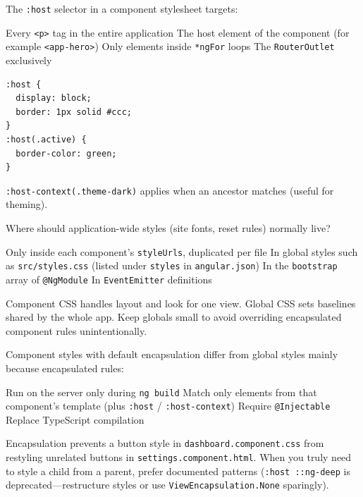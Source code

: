 \question[4]
The \lstinline[style=htmlinline]|:host| selector in a component stylesheet targets:
\begin{choices}
  \choice Every \texttt{<p>} tag in the entire application
  \CorrectChoice The host element of the component (for example \lstinline[style=htmlinline]|<app-hero>|)
  \choice Only elements inside \lstinline[style=htmlinline]|*ngFor| loops
  \choice The \texttt{RouterOutlet} exclusively
\end{choices}
\begin{solution}
\begin{lstlisting}[style=htmlinline]
:host {
  display: block;
  border: 1px solid #ccc;
}
:host(.active) {
  border-color: green;
}
\end{lstlisting}
  \lstinline[style=htmlinline]|:host-context(.theme-dark)| applies when an ancestor matches (useful for theming).
\end{solution}

\question[4]
Where should application-wide styles (site fonts, reset rules) normally live?
\begin{choices}
  \choice Only inside each component's \texttt{styleUrls}, duplicated per file
  \CorrectChoice In global styles such as \texttt{src/styles.css} (listed under \texttt{styles} in \texttt{angular.json})
  \choice In the \texttt{bootstrap} array of \texttt{@NgModule}
  \choice In \lstinline[style=tsinline]|EventEmitter| definitions
\end{choices}
\begin{solution}
  Component CSS handles layout and look for one view. Global CSS sets baselines shared by the whole app. Keep globals small to avoid overriding encapsulated component rules unintentionally.
\end{solution}

\question[4]
Component styles with default encapsulation differ from global styles mainly because encapsulated rules:
\begin{choices}
  \choice Run on the server only during \texttt{ng build}
  \CorrectChoice Match only elements from that component's template (plus \lstinline[style=htmlinline]|:host| / \lstinline[style=htmlinline]|:host-context|)
  \choice Require \lstinline[style=tsinline]|@Injectable|
  \choice Replace TypeScript compilation
\end{choices}
\begin{solution}
  Encapsulation prevents a button style in \texttt{dashboard.component.css} from restyling unrelated buttons in \texttt{settings.component.html}. When you truly need to style a child from a parent, prefer documented patterns (\lstinline[style=htmlinline]|:host ::ng-deep| is deprecated---restructure styles or use \texttt{ViewEncapsulation.None} sparingly).
\end{solution}

